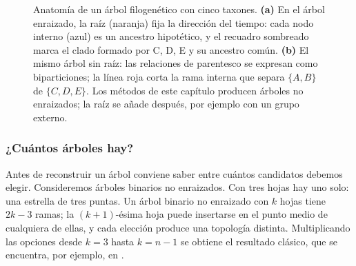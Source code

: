 \begin{figure}[t]
\caption[Anatomía de un árbol filogenético]{Anatomía de un árbol filogenético con cinco taxones. \textbf{(a)} En el árbol enraizado, la raíz (naranja) fija la dirección del tiempo: cada nodo interno (azul) es un ancestro hipotético, y el recuadro sombreado marca el clado formado por C, D, E y su ancestro común. \textbf{(b)} El mismo árbol sin raíz: las relaciones de parentesco se expresan como biparticiones; la línea roja corta la rama interna que separa $\{A,B\}$ de $\{C,D,E\}$. Los métodos de este capítulo producen árboles no enraizados; la raíz se añade después, por ejemplo con un grupo externo.}
\label{fig:05-anatomia}
\end{figure}

\subsubsection*{¿Cuántos árboles hay?}

Antes de reconstruir un árbol conviene saber entre cuántos candidatos debemos elegir. Consideremos árboles binarios no enraizados. Con tres hojas hay uno solo: una estrella de tres puntas. Un árbol binario no enraizado con $k$ hojas tiene $2k-3$ ramas; la $(k+1)$-ésima hoja puede insertarse en el punto medio de cualquiera de ellas, y cada elección produce una topología distinta. Multiplicando las opciones desde $k=3$ hasta $k=n-1$ se obtiene el resultado clásico, que se encuentra, por ejemplo, en \textcite{c05-felsenstein2004}.

